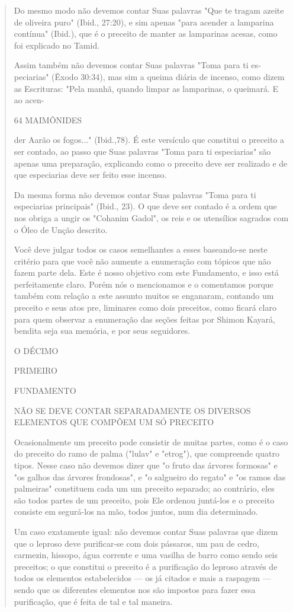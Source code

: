 \begin{quote}
Do mesmo modo não devemos contar Suas palavras "Que te tragam azeite de
oliveira puro" (Ibid., 27:20), e sim apenas "para acender a lamparina
contínua" (Ibid.), que é o preceito de manter as lamparinas acesas, como
foi explicado no Tamid.

Assim também não devemos contar Suas palavras "Toma para ti
es­peciarias" (Êxodo 30:34), mas sim a queima diária de incenso, como
dizem as Escrituras: "Pela manhã, quando limpar as lamparinas, o
queimará. E ao acen-

64 MAIMÔNIDES

der Aarão os fogos..." (Ibid.,78). É este versículo que constitui o
preceito a ser contado, ao passo que Suas palavras "Toma para ti
especiarias" são apenas uma preparação, explicando como o preceito deve
ser realizado e de que especia­rias deve ser feito esse incenso.

Da mesma forma não devemos contar Suas palavras "Toma para ti
especiarias principais" (Ibid., 23). O que deve ser contado é a ordem
que nos obriga a ungir os "Cohanim Gadol", os reis e os utensílios
sagrados com o Óleo de Unção descrito.

Você deve julgar todos os casos semelhantes a esses baseando-se neste
critério para que você não aumente a enumeração com tópicos que não
fazem parte dela. Este é nosso objetivo com este Fundamento, e isso está
perfeitamente claro. Porém nós o mencionamos e o comentamos porque
também com rela­ção a este assunto muitos se enganaram, contando um
preceito e seus atos pre­, liminares como dois preceitos, como ficará
claro para quem observar a enume­ração das seções feitas por Shimon
Kayará, bendita seja sua memória, e por seus seguidores.

O DÉCIMO

PRIMEIRO

FUNDAMENTO

NÃO SE DEVE CONTAR SEPARADAMENTE OS DIVERSOS ELEMENTOS QUE COMPÕEM UM SÓ
PRECEITO

Ocasionalmente um preceito pode consistir de muitas partes, como é o
caso do preceito do ramo de palma ("lulav" e "etrog"), que compreende
quatro tipos. Nesse caso não devemos dizer que "o fruto das árvores
formo­sas" e "os galhos das árvores frondosas", e "o salgueiro do
regato" e "os ra­mos das palmeiras" constituem cada um um preceito
separado; ao contrário, eles são todos partes de um preceito, pois Ele
ordenou juntá-los e o preceito consiste em segurá-los na mão, todos
juntos, num dia determinado.

Um caso exatamente igual: não devemos contar Suas palavras que dizem que
o leproso deve purificar-se com dois pássaros, um pau de cedro,
carmezin, hissopo, água corrente e uma vasilha de barro como sendo seis
pre­ceitos; o que constitui o preceito é a purificação do leproso
através de todos os elementos estabelecidos --- os já citados e mais a
raspagem --- sendo que os diferentes elementos nos são impostos para
fazer essa purificação, que é fei­ta de tal e tal maneira.


\end{quote}
